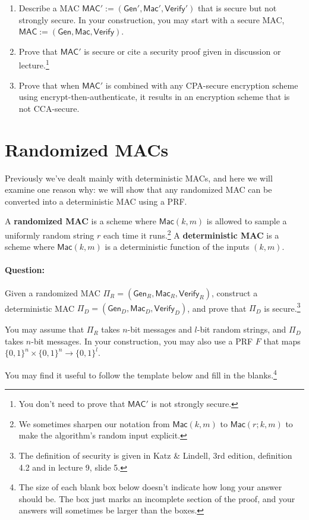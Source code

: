 \documentclass[11pt]{article}
\numberwithin{equation}{section}
\newcommand{\bin}{\{0,1\}}
\newcommand{\MAC}{\mathsf{MAC}}
\newcommand{\gen}{\mathsf{Gen}}
\newcommand{\mac}{\mathsf{Mac}}
\newcommand{\verify}{\mathsf{Verify}}
\begin{document}
\begin{enumerate}
    \item Describe a MAC $\MAC' := (\gen', \mac', \verify')$ that is secure but not strongly secure. In your construction, you may start with a secure MAC, $\MAC := (\gen, \mac, \verify)$.
    \item Prove that $\MAC'$ is secure or cite a security proof given in discussion or lecture.\footnote{You don't need to prove that $\MAC'$ is not strongly secure.}
    \item Prove that when $\MAC'$ is combined with any CPA-secure encryption scheme using encrypt-then-authenticate, it results in an encryption scheme that is not CCA-secure.
\end{enumerate}

\pagebreak


\section{Randomized MACs}
Previously we've dealt mainly with deterministic MACs, and here we will examine one reason why: we will show that any randomized MAC can be converted into a deterministic MAC using a PRF.

A \textbf{randomized MAC} is a scheme where $\mac(k,m)$ is allowed to sample a uniformly random string $r$ each time it runs.\footnote{We sometimes sharpen our notation from $\mac(k,m)$ to $\mac(r;k,m)$ to make the algorithm's random input explicit.} A \textbf{deterministic MAC} is a scheme where $\mac(k,m)$ is a deterministic function of the inputs $(k,m)$.

\paragraph{Question:} Given a randomized MAC $\Pi_R = (\gen_R,\allowbreak \mac_R,\allowbreak \verify_R)$, construct a deterministic MAC $\Pi_D = (\gen_D,\allowbreak \mac_D,\allowbreak \verify_D)$, and prove that $\Pi_D$ is secure.\footnote{The definition of security is given in Katz \& Lindell, 3rd edition, definition 4.2 and in lecture 9, slide 5.}

You may assume that $\Pi_R$ takes $n$-bit messages and $l$-bit random strings, and $\Pi_D$ takes $n$-bit messages. In your construction, you may also use a PRF $F$ that maps $\bin^n \times \bin^{n} \to \bin^{l}$. \newline

\noindent You may find it useful to follow the template below and fill in the blanks.\footnote{The size of each blank box below doesn't indicate how long your answer should be. The box just marks an incomplete section of the proof, and your answers will sometimes be larger than the boxes.}
\end{document}
